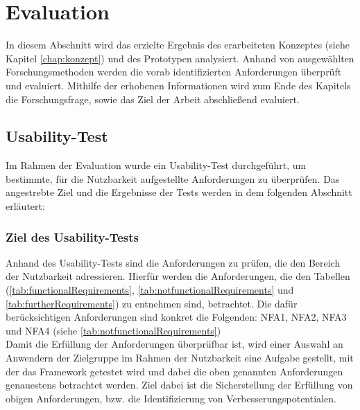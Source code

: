 \chapter{Evaluation}
\label{chap:evaluation}
In diesem Abschnitt wird das erzielte Ergebnis des erarbeiteten Konzeptes (siehe Kapitel \ref{chap:konzept}) und des 
Prototypen analysiert. Anhand von ausgewählten Forschungsmethoden werden die vorab identifizierten Anforderungen überprüft 
und evaluiert. Mithilfe der erhobenen Informationen wird zum Ende des Kapitels die Forschungsfrage, sowie das
Ziel der Arbeit abschließend evaluiert. 

\section{Usability-Test}
\label{sec:usabilitytest}
    Im Rahmen der Evaluation wurde ein Usability-Test durchgeführt, um bestimmte, für die Nutzbarkeit aufgestellte Anforderungen zu 
    überprüfen.
    Das angestrebte Ziel und die Ergebnisse der Tests werden in dem folgenden Abschnitt erläutert:
    
    \subsection{Ziel des Usability-Tests}
        Anhand des Usability-Tests sind die Anforderungen zu prüfen, die den Bereich der Nutzbarkeit adressieren. 
        Hierfür werden die Anforderungen, die den Tabellen (\ref{tab:functionalRequirements}, \ref{tab:notfunctionalRequirements} und \ref{tab:furtherRequirements}) 
        zu entnehmen sind, betrachtet. Die dafür berücksichtigen Anforderungen sind konkret die Folgenden: NFA1, NFA2, NFA3 und NFA4 (siehe \ref{tab:notfunctionalRequirements})
        \\
        Damit die Erfüllung der Anforderungen überprüfbar ist, wird einer Auswahl an Anwendern der Zielgruppe im Rahmen der Nutzbarkeit 
        eine Aufgabe gestellt, mit der das Framework getestet wird und dabei die oben genannten Anforderungen genauestens betrachtet werden. 
        Ziel dabei ist die Sicherstellung der Erfüllung von obigen Anforderungen, bzw. die Identifizierung von Verbesserungspotentialen. 

